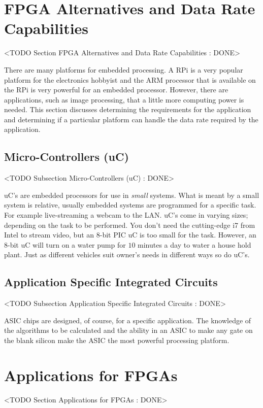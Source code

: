 \section{FPGA Alternatives and Data Rate Capabilities}
	<TODO Section FPGA Alternatives and Data Rate Capabilities : DONE>

There are many platforms for embedded processing. A \ac{RPi} is a very popular platform for the electronics hobbyist and the \ac{ARM} processor that is available on the \ac{RPi} is very powerful for an embedded processor. However, there are applications, such as image processing, that a little more computing power is needed. This section discusses determining the requirements for the application and determining if a particular platform can handle the data rate required by the application. 

\subsection{Micro-Controllers (uC)}
	<TODO Subsection Micro-Controllers (uC) : DONE>

\ac{uC}'s are embedded processors for use in \emph{small} systems. What is meant by a small system is relative, usually embedded systems are programmed for a specific task. For example live-streaming a webcam to the \ac{LAN}. \ac{uC}'s come in varying sizes; depending on the task to be performed. You don't need the cutting-edge i7 from Intel to stream video, but an 8-bit \ac{PIC} \ac{uC} is too small for the task. However, an 8-bit \ac{uC} will turn on a water pump for $10$ minutes a day to water a house hold plant. Just as different vehicles suit owner's needs in different ways so do \ac{uC}'s.

\subsection{Application Specific Integrated Circuits}
	<TODO Subsection Application Specific Integrated Circuits : DONE>

\ac{ASIC} chips are designed, of course, for a specific application. The knowledge of the algorithms to be calculated and the ability in an \ac{ASIC} to make any gate on the blank silicon make the \ac{ASIC} the most powerful processing platform. 

\section{Applications for FPGAs}
	<TODO Section Applications for FPGAs : DONE>

